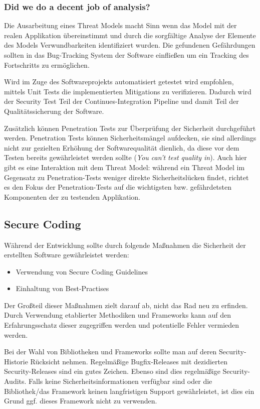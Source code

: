 \subsubsection{Did we do a decent job of analysis?}

Die Ausarbeitung eines Threat Models macht Sinn wenn das Model mit der realen Applikation übereinstimmt und durch die sorgfältige Analyse der Elemente des Models Verwundbarkeiten identifiziert wurden. Die gefundenen Gefährdungen sollten in das Bug-Tracking System der Software einfließen um ein Tracking des Fortschritts zu ermöglichen.

Wird im Zuge des Softwareprojekts automatisiert getestet wird empfohlen, mittels Unit Tests die implementierten Mitigations zu verifizieren. Dadurch wird der Security Test Teil der Continues-Integration Pipeline und damit Teil der Qualitätssicherung der Software.

Zusätzlich können Penetration Tests zur Überprüfung der Sicherheit durchgeführt werden. Penetration Tests können Sicherheitsmängel aufdecken, sie sind allerdings nicht zur gezielten Erhöhung der Softwarequalität dienlich, da diese vor dem Testen bereits gewährleistet werden sollte (\textit{You can't test quality in}). Auch hier gibt es eine Interaktion mit dem Threat Model: während ein Threat Model im Gegensatz zu Penetration-Tests weniger direkte Sicherheitslücken findet, richtet es den Fokus der Penetration-Tests auf die wichtigsten bzw. gefährdetsten Komponenten der zu testenden Applikation.

\subsection{Secure Coding}

Während der Entwicklung sollte durch folgende Maßnahmen die Sicherheit der erstellten Software gewährleistet werden: 

\begin{itemize}
	\item Verwendung von Secure Coding Guidelines
	\item Einhaltung von Best-Practises
\end{itemize}

Der Großteil dieser Maßnahmen zielt darauf ab, nicht das Rad neu zu erfinden. Durch Verwendung etablierter Methodiken und Frameworks kann auf den Erfahrungsschatz dieser zugegriffen werden und potentielle Fehler vermieden werden.

Bei der Wahl von Bibliotheken und Frameworks sollte man auf deren Security-Historie Rücksicht nehmen. Regelmäßige Bugfix-Releases mit dezidierten Security-Releases sind ein gutes Zeichen. Ebenso sind dies regelmäßige Security-Audits. Falls keine Sicherheitsinformationen verfügbar sind oder die Bibliothek/das Framework keinen langfristigen Support gewährleistet, ist dies ein Grund ggf. dieses Framework nicht zu verwenden.

